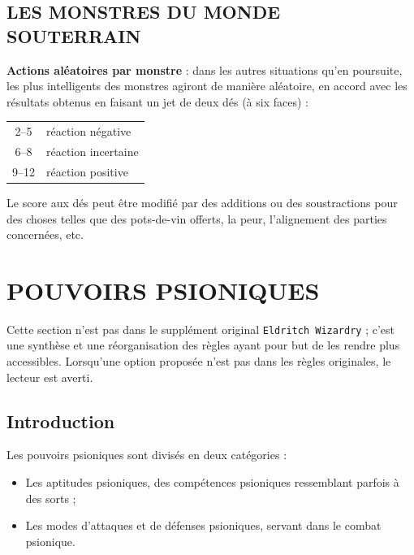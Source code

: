 \documentclass[11pt]{article}
\begin{document}
{%
\subsection*{LES MONSTRES DU MONDE SOUTERRAIN}

\textbf{Actions aléatoires par monstre} : dans les autres situations qu'en poursuite, les plus intelligents des monstres agiront de manière aléatoire, en accord avec les résultats obtenus en faisant un jet de deux dés (à six faces) :

\bigskip

{\parindent6cm \begin{tabular}{cl}
2--5 & réaction négative \\
6--8 & réaction incertaine \\
9--12 & réaction positive \\
\end{tabular}}

\medskip

Le score aux dés peut être modifié par des additions ou des soustractions pour des choses telles que des pots-de-vin offerts, la peur, l'alignement des parties concernées, etc.

\newpage
\section*{POUVOIRS PSIONIQUES}

Cette section n'est pas dans le supplément original \texttt{Eldritch Wizardry} ; c'est une synthèse et une réorganisation des règles ayant pour but de les rendre plus accessibles. Lorsqu'une option proposée n'est pas dans les règles originales, le lecteur est averti.

\subsection*{Introduction}

Les pouvoirs psioniques sont divisés en deux catégories :

\bigskip

\begin{itemize}
\item Les aptitudes psioniques, des compétences psioniques ressemblant parfois à des sorts ;
\item Les modes d'attaques et de défenses psioniques, servant dans le combat psionique.
\end{itemize}

}
\end{document}
